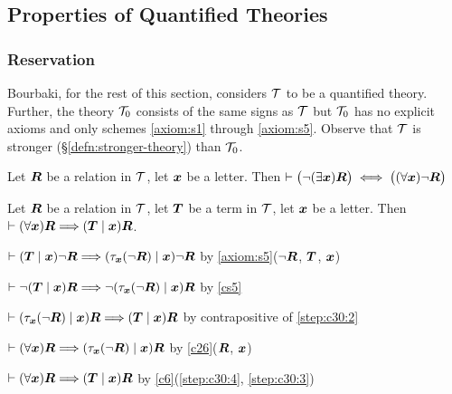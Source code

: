 \subsection{Properties of Quantified Theories}

\subsubsection{Reservation}
Bourbaki, for the rest of this section, considers $\mathcal{T}$ to be a
quantified theory. Further, the theory $\mathcal{T}_{0}$ consists of the
same signs as $\mathcal{T}$ but $\mathcal{T}_{0}$ has no explicit axioms
and only schemes \ref{axiom:s1} through \ref{axiom:s5}. Observe that
$\mathcal{T}$ is stronger (\S\ref{defn:stronger-theory}) than $\mathcal{T}_{0}$.

\begin{dc}\label{c29}%
Let $\boldsymbol{R}$ be a relation in $\mathcal{T}$, let
$\boldsymbol{x}$ be a letter. Then $\vdash\bigl(\neg(\exists\boldsymbol{x})\boldsymbol{R}\bigr)\iff\bigl((\forall\boldsymbol{x})\neg\boldsymbol{R}\bigr)$
\end{dc}

\begin{dc}\label{c30}%
Let $\boldsymbol{R}$ be a relation in $\mathcal{T}$, let
$\boldsymbol{T}$ be a term in $\mathcal{T}$, let $\boldsymbol{x}$ be
a letter. Then $\vdash(\forall\boldsymbol{x})\boldsymbol{R}\Longrightarrow(\boldsymbol{T}\mid\boldsymbol{x})\boldsymbol{R}$.
\end{dc}

\begin{pf}
\item\label{step:c30:1}\Pf $\vdash(\boldsymbol{T}\mid\boldsymbol{x})\neg\boldsymbol{R}\Longrightarrow(\tau_{\boldsymbol{x}}(\neg\boldsymbol{R})\mid\boldsymbol{x})\neg\boldsymbol{R}$
by \ref{axiom:s5}($\neg\boldsymbol{R}$, $\boldsymbol{T}$, $\boldsymbol{x}$)
\item\label{step:c30:2} $\vdash\neg(\boldsymbol{T}\mid\boldsymbol{x})\boldsymbol{R}\Longrightarrow\neg(\tau_{\boldsymbol{x}}(\neg\boldsymbol{R})\mid\boldsymbol{x})\boldsymbol{R}$
by \ref{cs5}
\item\label{step:c30:3} $\vdash(\tau_{\boldsymbol{x}}(\neg\boldsymbol{R})\mid\boldsymbol{x})\boldsymbol{R}\Longrightarrow(\boldsymbol{T}\mid\boldsymbol{x})\boldsymbol{R}$
  by contrapositive of \ref{step:c30:2}
\item\label{step:c30:4} $\vdash(\forall\boldsymbol{x})\boldsymbol{R}\Longrightarrow(\tau_{\boldsymbol{x}}(\neg\boldsymbol{R})\mid\boldsymbol{x})\boldsymbol{R}$
  by \ref{c26}($\boldsymbol{R}$, $\boldsymbol{x}$)
\item\label{step:c30:5} $\vdash(\forall\boldsymbol{x})\boldsymbol{R}\Longrightarrow(\boldsymbol{T}\mid\boldsymbol{x})\boldsymbol{R}$
  by \ref{c6}(\ref{step:c30:4}, \ref{step:c30:3})
\end{pf}

